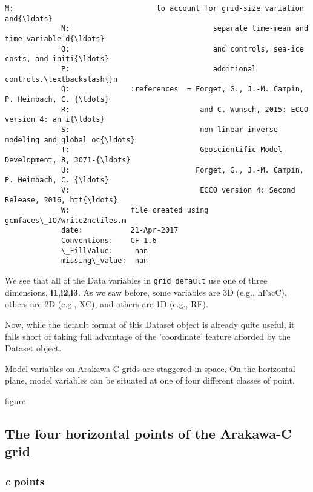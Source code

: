 \documentclass[11pt]{article}
\begin{document}
\begin{Verbatim}[commandchars=\\\{\}]
             M:                                 to account for grid-size variation and{\ldots}
             N:                                 separate time-mean and time-variable d{\ldots}
             O:                                 and controls, sea-ice costs, and initi{\ldots}
             P:                                 additional controls.\textbackslash{}n 
             Q:              :references  = Forget, G., J.-M. Campin, P. Heimbach, C. {\ldots}
             R:                              and C. Wunsch, 2015: ECCO version 4: an i{\ldots}
             S:                              non-linear inverse modeling and global oc{\ldots}
             T:                              Geoscientific Model Development, 8, 3071-{\ldots}
             U:                             Forget, G., J.-M. Campin, P. Heimbach, C. {\ldots}
             V:                              ECCO version 4: Second Release, 2016, htt{\ldots}
             W:              file created using gcmfaces\_IO/write2nctiles.m
             date:           21-Apr-2017
             Conventions:    CF-1.6
             \_FillValue:     nan
             missing\_value:  nan
\end{Verbatim}
            
    We see that all of the Data variables in \texttt{grid\_default} use one
of three dimensions, \textbf{i1},\textbf{i2},\textbf{i3}. As we saw
before, some variables are 3D (e.g., hFacC), others are 2D (e.g., XC),
and others are 1D (e.g., RF).

Now, while the default format of this Dataset object is already quite
useful, it falls short of taking full advantage of the 'coordinate'
feature afforded by the Dataset object.

Model variables on Arakawa-C grids are staggered in space. On the
horizontal plane, model variables can be situated at one of four
different classes of point.

figure

\subsection{The four horizontal points of the Arakawa-C
grid}\label{the-four-horizontal-points-of-the-arakawa-c-grid}

\subsubsection{\texorpdfstring{\emph{c}
points}{c points}}\label{c-points}
\end{document}
